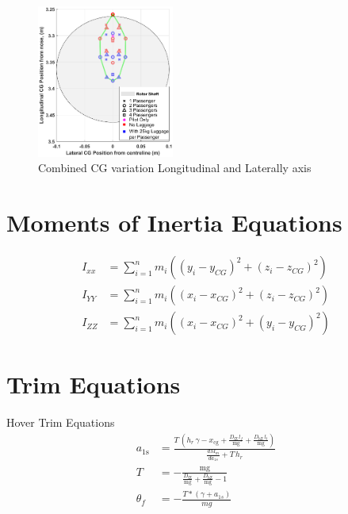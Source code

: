 \documentclass[11pt,a4paper]{article}
\begin{document}
\begin{appendices}
\begin{figure}[H]
    \centering
    \includegraphics[width=0.4\textwidth]{CGLATVLONG.eps}
    \caption{Combined CG variation Longitudinal and Laterally axis}
    \label{fig:cglongvlat}
\end{figure}{}
%
%
\section{Moments of Inertia Equations}
\renewcommand\thefigure{B.\arabic{figure}}  
\setcounter{figure}{0}
\renewcommand\theequation{B.\arabic{equation}}  
\setcounter{equation}{0}
\renewcommand\thetable{B.\arabic{table}}  
\setcounter{table}{0}
\begin{align}
I_{xx}&=\sum_{i=1}^{n} m_{i}\left(\left(y_{i}-y_{C G}\right)^{2}+\left(z_{i}-z_{C G}\right)^{2}\right)\label{eq:ixx}\\
   I_{YY}&=\sum_{i=1}^{n} m_{i}\left(\left(x_{i}-x_{C G}\right)^{2}+\left(z_{i}-z_{C G}\right)^{2}\right)\\
   I_{ZZ}&=\sum_{i=1}^{n} m_{i}\left(\left(x_{i}-x_{C G}\right)^{2}+\left(y_{i}-y_{C G}\right)^{2}\right) \label{eq:izz}
\end{align}{}

\thispagestyle{empty}
%
%
\section{Trim Equations}
\renewcommand\thefigure{C.\arabic{figure}}  
\setcounter{figure}{0}
\renewcommand\theequation{C.\arabic{equation}}  
\setcounter{equation}{0}
\renewcommand\thetable{C.\arabic{table}}  
\setcounter{table}{0}
\thispagestyle{empty}
Hover Trim Equations
\begin{align}
    a_{\mathrm{1s}}&=\frac{T\,\left(h_{r}\,\gamma-x_{\mathrm{cg}}+\frac{D_{\mathrm{fZ}}\,l_{f}}{\mathrm{mg}}+\frac{D_{\mathrm{hZ}}\,l_{t}}{\mathrm{mg}}\right)}{\frac{dM_m}{da_{1s}}+T\,h_{r}}\\
    T&=-\frac{\mathrm{mg}}{\frac{D_{\mathrm{fZ}}}{\mathrm{mg}}+\frac{D_{\mathrm{hZ}}}{\mathrm{mg}}-1}\\
    \theta_f&=-\frac{T*(\gamma + a_{1s})}{mg} \label{eq:trimeq}
\end{align}{}


\end{appendices}
\end{document}
